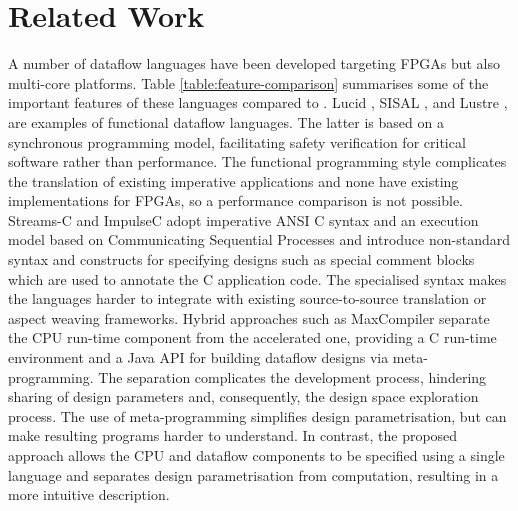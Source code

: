 \section{Related Work}

A number of dataflow languages have been developed targeting FPGAs but
also multi-core platforms. Table \ref{table:feature-comparison}
summarises some of the important features of these languages compared
to \MAXC{}. Lucid \cite{ashcroft1977lucid}, SISAL
\cite{gurd1987implicit}, \cite{mcgraw1983sisal} and Lustre
\cite{halbwachs1991synchronous}, are examples of functional dataflow
languages. The latter is based on a synchronous programming model,
facilitating safety verification for critical software
\cite{halbwachs1992programming} rather than performance. The
functional programming style complicates the translation of existing
imperative applications and none have existing implementations for
FPGAs, so a performance comparison is not possible.
Streams-C\cite{Gokhale:Stone:Arnold:Kalinowski:2000} and
ImpulseC\cite{ImpulseC} adopt imperative ANSI C syntax and an
execution model based on Communicating Sequential Processes and
introduce non-standard syntax and constructs for specifying designs
such as special comment blocks which are used to annotate the C
application code. The specialised syntax makes the languages harder to
integrate with existing source-to-source translation or aspect weaving
frameworks. Hybrid approaches such as MaxCompiler\cite{5719584}
separate the CPU run-time component from the accelerated one,
providing a C run-time environment and a Java API for building
dataflow designs via meta-programming. The separation complicates the
development process, hindering sharing of design parameters and,
consequently, the design space exploration process. The use of
meta-programming simplifies design parametrisation, but can make
resulting programs harder to understand. In contrast, the proposed
approach allows the CPU and dataflow components to be specified using
a single language and separates design parametrisation from
computation, resulting in a more intuitive description.

